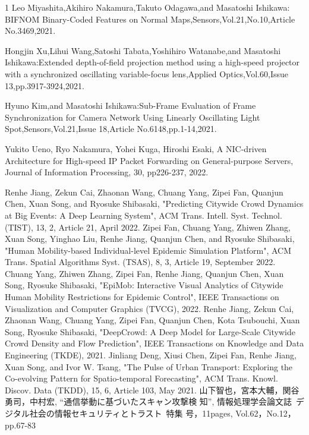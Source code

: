 \begin{雑誌論文}{1}
Leo Miyashita,Akihiro Nakamura,Takuto Odagawa,and Masatoshi Ishikawa: BIFNOM Binary-Coded Features on Normal Maps,Sensors,Vol.21,No.10,Article No.3469,2021.


Hongjin Xu,Lihui Wang,Satoshi Tabata,Yoshihiro Watanabe,and Masatoshi Ishikawa:Extended depth-of-field projection method using a high-speed projector with a synchronized oscillating variable-focus lens,Applied Optics,Vol.60,Issue 13,pp.3917-3924,2021.

Hyuno Kim,and Masatoshi Ishikawa:Sub-Frame Evaluation of Frame Synchronization for Camera Network Using Linearly Oscillating Light Spot,Sensors,Vol.21,Issue 18,Article No.6148,pp.1-14,2021.

Yukito Ueno, Ryo Nakamura, Yohei Kuga, Hiroshi Esaki, A NIC-driven Architecture for High-speed IP Packet Forwarding on General-purpose Servers, Journal of Information Processing, 30, pp226-237, 2022.

Renhe Jiang, Zekun Cai, Zhaonan Wang, Chuang Yang, Zipei Fan, Quanjun Chen, Xuan Song, and Ryosuke Shibasaki, "Predicting Citywide Crowd Dynamics at Big Events: A Deep Learning System", ACM Trans. Intell. Syst. Technol. (TIST), 13, 2, Article 21, April 2022.
Zipei Fan, Chuang Yang, Zhiwen Zhang, Xuan Song, Yinghao Liu, Renhe Jiang, Quanjun Chen, and Ryosuke Shibasaki, "Human Mobility-based Individual-level Epidemic Simulation Platform", ACM Trans. Spatial Algorithms Syst. (TSAS), 8, 3, Article 19, September 2022.
Chuang Yang, Zhiwen Zhang, Zipei Fan, Renhe Jiang, Quanjun Chen, Xuan Song, Ryosuke Shibasaki, "EpiMob: Interactive Visual Analytics of Citywide Human Mobility Restrictions for Epidemic Control", IEEE Transactions on Visualization and Computer Graphics (TVCG), 2022.
Renhe Jiang, Zekun Cai, Zhaonan Wang, Chuang Yang, Zipei Fan, Quanjun Chen, Kota Tsubouchi, Xuan Song, Ryosuke Shibasaki, "DeepCrowd: A Deep Model for Large-Scale Citywide Crowd Density and Flow Prediction", IEEE Transactions on Knowledge and Data Engineering (TKDE), 2021.
Jinliang Deng, Xiusi Chen, Zipei Fan, Renhe Jiang, Xuan Song, and Ivor W. Tsang, "The Pulse of Urban Transport: Exploring the Co-evolving Pattern for Spatio-temporal Forecasting", ACM Trans. Knowl. Discov. Data (TKDD), 15, 6, Article 103, May 2021.
山下智也，宮本大輔，関谷勇司，中村宏, ``通信挙動に基づいたスキャン攻撃検
知'', 情報処理学会論文誌~デジタル社会の情報セキュリティとトラスト~特集
号，11pages, Vol.62，No.12，pp.67-83


\end{雑誌論文}

